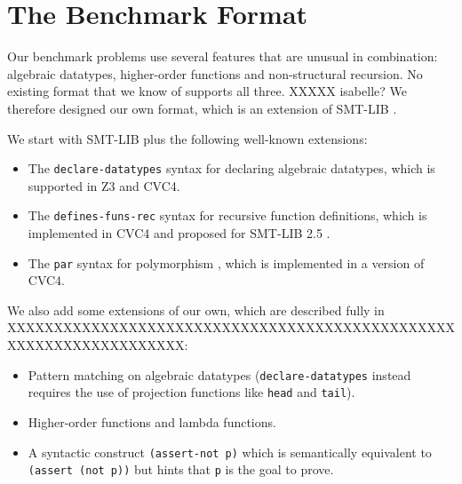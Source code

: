 \documentclass{llncs}
\begin{document}

\section{The Benchmark Format}
\label{sec:format}
Our benchmark problems use several features that are unusual in
combination: algebraic datatypes, higher-order functions and
non-structural recursion. No existing format that we know of supports
all three. XXXXX isabelle? We therefore designed our own format, which
is an extension of SMT-LIB \cite{BST10}.

We start with SMT-LIB plus the following well-known extensions:
\begin{itemize}
\item The \verb|declare-datatypes| syntax for declaring algebraic
  datatypes, which is supported in Z3 and CVC4.
\item The \verb|defines-funs-rec| syntax for recursive function
  definitions, which is implemented in CVC4 and proposed for
  SMT-LIB 2.5 \cite{BST10}.
\item The \verb|par| syntax for polymorphism \cite{cvc4parPR}, which
  is implemented in a version of CVC4.
\end{itemize}

We also add some extensions of our own, which are described fully in
XXXXXXXXXXXXXXXXXXXXXXXXXXXXXXXXXXXXXXXXXXXXXXXXXXXXXXXXXXXXXXXXXXX:
\begin{itemize}
\item Pattern matching on algebraic datatypes
  (\verb|declare-datatypes| instead requires the use of projection
  functions like \verb|head| and \verb|tail|).
\item Higher-order functions and lambda functions.
\item A syntactic construct \verb|(assert-not p)| which is
  semantically equivalent to \verb|(assert (not p))| but hints that
  \verb|p| is the goal to prove.
\end{itemize}
\end{document}
